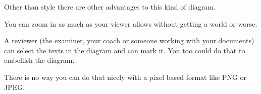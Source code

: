 Other than style there are other advantages to this kind of diagram.
\begin{Itemize}
\item You can zoom in as much as your viewer allows without getting a  world or worse.
\item A reviewer (the examiner, your coach or someone working with your documents) can select the texts in the diagram and can mark it. You too could do that to embellish the diagram.
\item There is no way you can do that nicely with a pixel based format like PNG or JPEG.
\end{Itemize}

